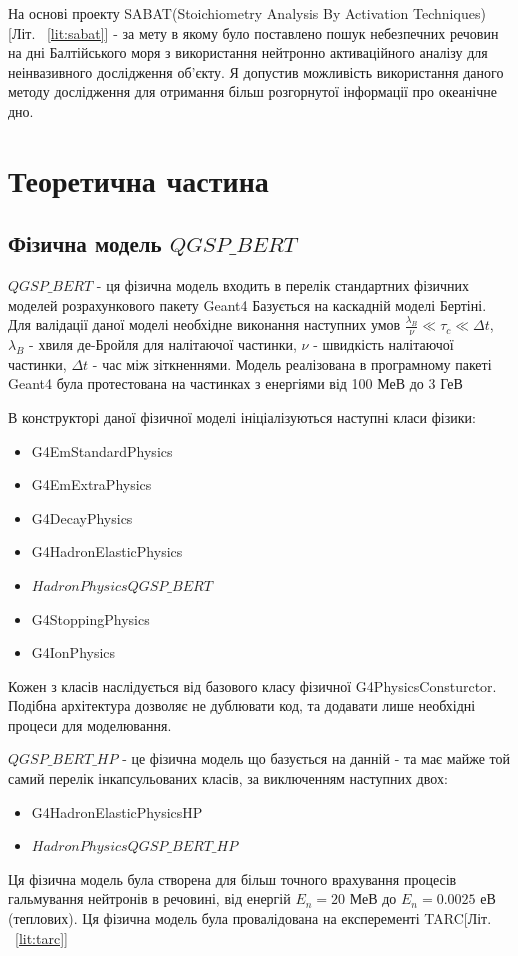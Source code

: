 \documentclass[a4paper, 14pt]{article}
\numberwithin{equation}{section}
\numberwithin{table}{section}
\begin{document}
	На основі проекту SABAT(Stoichiometry Analysis By Activation Techniques)[Літ. ~\ref{lit:sabat}] - за мету в якому було поставлено пошук небезпечних речовин на дні Балтійського моря з використання нейтронно активаційного аналізу для неінвазивного дослідження об'єкту. Я допустив можливість використання даного методу дослідження для отримання більш розгорнутої інформації про океанічне дно.		
	
	
	\setcounter{figure}{0} 
	\newpage
	\section{Теоретична частина}
	\setcounter{figure}{0} 
	\subsection{Фізична модель $QGSP\_BERT$}
	$QGSP\_BERT$ - ця фізична модель входить в перелік стандартних фізичних моделей розрахункового пакету Geant4
	Базується на каскадній моделі Бертіні. Для валідації даної моделі необхідне виконання наступних умов $\frac{\lambda_B}{\nu} \ll \tau_c \ll \Delta{t}$, $\lambda_B$ - хвиля де-Бройля для налітаючої частинки, $\nu$ - швидкість налітаючої частинки, $\Delta{t}$ - час між зіткненнями. 
	Модель реалізована в програмному пакеті Geant4 була протестована на частинках з енергіями від 100 МеВ до 3 ГеВ
	
	В конструкторі даної фізичної моделі ініціалізуються наступні класи фізики: 
	\begin{itemize}
		\item G4EmStandardPhysics
		\item G4EmExtraPhysics
		\item G4DecayPhysics
		\item G4HadronElasticPhysics
		\item $HadronPhysicsQGSP\_BERT$
		\item G4StoppingPhysics
		\item G4IonPhysics
	\end{itemize}
	Кожен з класів наслідується від базового класу фізичної G4PhysicsConsturctor. Подібна архітектура дозволяє не дублювати код, та додавати лише необхідні процеси для моделювання.
	
	$QGSP\_BERT\_HP$ - це фізична модель що базується на данній - та має майже той самий перелік інкапсульованих класів, за виключенням наступних двох:
	\begin{itemize}
		\item G4HadronElasticPhysicsHP
		\item $HadronPhysicsQGSP\_BERT\_HP$
	\end{itemize}
	Ця фізична модель була створена для більш точного врахування процесів гальмування нейтронів в речовині, від енергій $E_n = 20$ МеВ до $E_n = 0.0025$ еВ (теплових). Ця фізична модель була провалідована на експеременті TARC[Літ. ~\ref{lit:tarc}]
	
\end{document}
